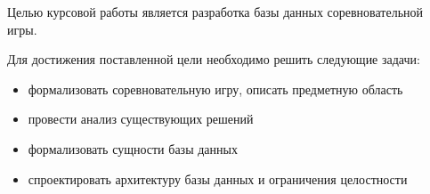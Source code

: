 
Целью курсовой работы является разработка базы данных соревновательной игры.
 
Для достижения поставленной цели необходимо решить следующие задачи:
\begin{itemize}
	\item формализовать соревновательную игру, описать предметную область
	\item провести анализ существующих решений
	\item формализовать сущности базы данных
	\item спроектировать архитектуру базы данных и ограничения целостности
\end{itemize}

\clearpage
